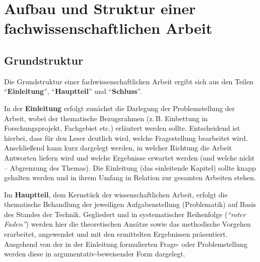 
\chapter{Aufbau und Struktur einer fachwissenschaftlichen Arbeit}
\label{cap:Aufbau und Struktur einer fachwissenschaftlichen Arbeit}

\section{Grundstruktur}
\label{sec:Grundstruktur}

Die Grundstruktur einer fachwissenschaftlichen Arbeit ergibt sich aus den Teilen "`\textbf{Einleitung}"', "`\textbf{Hauptteil}"' und "`\textbf{Schluss}"'.

In der \textbf{Einleitung} erfolgt zunächst die Darlegung der Problemstellung der Arbeit, wobei der thematische Bezugsrahmen (z.\,B. Einbettung in Forschungsprojekt, Fachgebiet etc.) erläutert werden sollte. Entscheidend ist hierbei, dass für den Leser deutlich wird, welche Fragestellung bearbeitet wird. Anschließend kann kurz dargelegt werden, in welcher Richtung die Arbeit Antworten liefern wird und welche Ergebnisse erwartet werden (und welche nicht – Abgrenzung des Themas). Die Einleitung (das einleitende Kapitel) sollte knapp gehalten werden und in ihrem Umfang in Relation zur gesamten Arbeiten stehen.

Im \textbf{Hauptteil}, dem Kernstück der wissenschaftlichen Arbeit, erfolgt die thematische Behandlung der jeweiligen Aufgabenstellung (Problematik) auf Basis des Standes der Technik. Gegliedert und in systematischer Reihenfolge (\emph{"`roter Faden"'}) werden hier die theoretischen Ansätze sowie das methodische Vorgehen erarbeitet, angewendet und mit den ermittelten Ergebnissen präsentiert. Ausgehend von der in der Einleitung formulierten Frage- oder Problemstellung werden diese in argumentativ-beweisender Form dargelegt.

